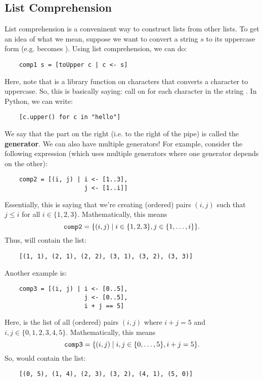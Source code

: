 \documentclass[letterpaper]{article}
\begin{document}
\subsection{List Comprehension}
List comprehension is a conveninent way to construct lists from other lists. To get an idea of what we mean, suppose we want to convert a string $s$ to its uppercase form (e.g.  becomes ). Using list comprehension, we can do: 
\begin{verbatim}
    comp1 s = [toUpper c | c <- s]\end{verbatim}
Here, note that  is a library function on characters that converts a character to uppercase. So, this is basically saying: call  on  for each character  in the string . In Python, we can write: 
\begin{verbatim}
    [c.upper() for c in "hello"]\end{verbatim}
We say that the part on the right (i.e. to the right of the pipe) is called the \textbf{generator}. We can also have multiple generators! For example, consider the following expression (which uses multiple generators where one generator depends on the other):
\begin{verbatim}
    comp2 = [(i, j) | i <- [1..3],
                      j <- [1..i]]\end{verbatim}
Essentially, this is saying that we're creating (ordered) pairs $(i, j)$ such that $j \leq i$ for all $i \in \{1, 2, 3\}$. Mathematically, this means 
\[\texttt{comp2} = \{(i, j) \mid i \in \{1, 2, 3\}, j \in \{1, \dots, i\}\}.\]
Thus,  will contain the list:
\begin{verbatim}
    [(1, 1), (2, 1), (2, 2), (3, 1), (3, 2), (3, 3)]\end{verbatim}
Another example is: 
\begin{verbatim}
    comp3 = [(i, j) | i <- [0..5],
                      j <- [0..5],
                      i + j == 5]
\end{verbatim}
Here,  is the list of all (ordered) pairs $(i, j)$ where $i + j = 5$ and $i, j \in \{0, 1, 2, 3, 4, 5\}$. Mathematically, this means 
\[\texttt{comp3} = \{(i, j) \mid i, j \in \{0, \dots, 5\}, i + j = 5\}.\]
So,  would contain the list:
\begin{verbatim}
    [(0, 5), (1, 4), (2, 3), (3, 2), (4, 1), (5, 0)]\end{verbatim}
\end{document}
